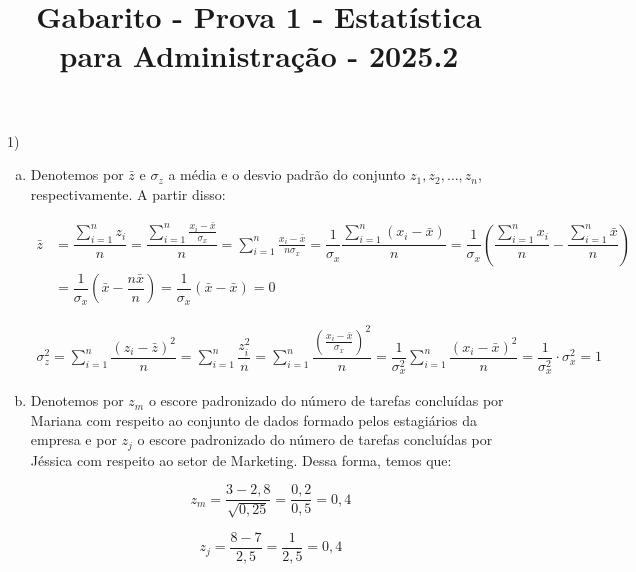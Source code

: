 \documentclass[12pt]{article}
\title{Gabarito - Prova 1 - Estatística para Administração - 2025.2}
\date{}
\makeatletter
\renewcommand{\maketitle}{
  \begin{center}
    {\bfseries \@title \par}
  \end{center}
  \vspace{-0.1cm} %
}
\makeatother
\begin{document}
\maketitle


1) 

\begin{enumerate}[a)]
    \item 
    
    Denotemos por $\bar{z}$ e $\sigma_z$ a média e o desvio padrão do conjunto  $z_1, z_2, \dots, z_n$,  respectivamente. A partir disso:

    \begin{align*}
        \bar{z} &= \dfrac{\displaystyle\sum_{i=1}^n  z_i}{n}
         = \dfrac{\displaystyle\sum_{i=1}^n \frac{x_i - \bar{x}}{\sigma_x}}{n}
        = \displaystyle\sum_{i=1}^n \frac{x_i - \bar{x}}{n \sigma_x}
        = \dfrac{1}{\sigma_x} \dfrac{\displaystyle\sum_{i=1}^n (x_i - \bar{x})}{n}
        = \dfrac{1}{\sigma_x} \left(\dfrac{\displaystyle\sum_{i=1}^n x_i}{n} - \dfrac{\displaystyle\sum_{i=1}^n \bar{x}}{n}\right)\\
        &= \dfrac{1}{\sigma_x} \left(\bar{x}- \dfrac{n \bar{x}}{n}\right) 
        =\dfrac{1}{\sigma_x} \left(\bar{x} - \bar{x}\right) = 0
    \end{align*}

    \begin{align*}
        \sigma_z^2 = \displaystyle\sum_{i=1}^n \dfrac{(z_i - \bar{z})^2}{n} = \displaystyle\sum_{i=1}^n \dfrac{z_i^2}{n}
        = \displaystyle\sum_{i=1}^n \dfrac{(\frac{x_i - \bar{x}}{\sigma_x})^2}{n}
        = \dfrac{1}{\sigma_x^2}\displaystyle\sum_{i=1}^n \dfrac{(x_i - \bar{x})^2}{n}
        = \dfrac{1}{\sigma_x^2} \cdot \sigma_x^2 = 1
    \end{align*}

    \item

Denotemos por $z_m$ o escore padronizado do número de tarefas concluídas por Mariana com respeito ao conjunto de dados formado pelos estagiários da empresa e por 
$z_j$ o escore padronizado do número de tarefas concluídas por Jéssica com respeito ao setor de Marketing. Dessa forma, temos que:


$$z_m = \dfrac{3 - 2,8}{\sqrt{0,25}} = \dfrac{0,2}{0,5} = 0,4$$

$$z_j = \dfrac{8 - 7}{2,5} = \dfrac{1}{2,5} = 0,4$$


\end{enumerate}
\end{document}
